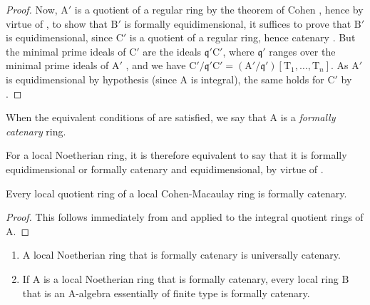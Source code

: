 \begin{proof}
Now, $\mathrm{A}'$ is a quotient of a regular ring by the theorem of Cohen , hence by virtue of , to show that $\mathrm{B}'$ is formally equidimensional, it suffices to prove that $\mathrm{B}'$ is equidimensional, since $\mathrm{C}'$ is a quotient of a regular ring, hence catenary .
But the minimal prime ideals of $\mathrm{C}'$ are the ideals $\mathfrak{q}'\mathrm{C}'$, where $\mathfrak{q}'$ ranges over the minimal prime ideals of $\mathrm{A}'$ , and we have $\mathrm{C}'/\mathfrak{q}'\mathrm{C}'=(\mathrm{A}'/\mathfrak{q}')[\mathrm{T}_1,\ldots,\mathrm{T}_n]$.
As $\mathrm{A}'$ is equidimensional by hypothesis (since $\mathrm{A}$ is integral), the same holds for $\mathrm{C}'$ by .
\end{proof}

\begin{definition}[7.1.9]
\label{IV.7.1.9}
When the equivalent conditions of  are satisfied, we say that $\mathrm{A}$ is a \emph{formally catenary} ring.
\end{definition}

For a local Noetherian ring, it is therefore equivalent to say that it is formally equidimensional or formally catenary and equidimensional, by virtue of .

\begin{proposition}[7.1.10]
\label{IV.7.1.10}
Every local quotient ring of a local Cohen-Macaulay ring is formally catenary.
\end{proposition}

\begin{proof}
This follows immediately from  and  applied to the integral quotient rings of $\mathrm{A}$.
\end{proof}

\begin{proposition}[7.1.11]
\label{IV.7.1.11}
\begin{enumerate}[label=\emph{\roman*)}]
  \item A local Noetherian ring that is formally catenary is universally catenary.
  \item If $\mathrm{A}$ is a local Noetherian ring that is formally catenary, every local ring $\mathrm{B}$ that is an A-algebra essentially of finite type is formally catenary.
\end{enumerate}
\end{proposition}

